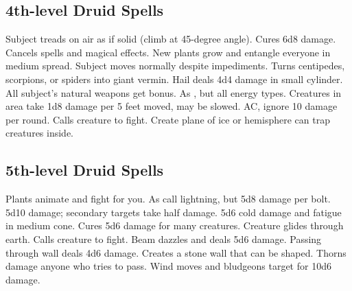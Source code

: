 \subsection{4th-level Druid Spells}
\begin{spelllist}
   Subject treads on air as if solid (climb at 45-degree angle).
   Cures 6d8 damage.
   Cancels spells and magical effects.
   New plants grow and entangle everyone in medium spread.
   Subject moves normally despite impediments.
   Turns centipedes, scorpions, or spiders into giant vermin.
   Hail deals 4d4 damage in small cylinder.
   All subject's natural weapons get  bonus.
   As , but all energy types.
   Creatures in area take 1d8 damage per 5 feet moved, may be slowed.
    AC, ignore 10 damage per round.
   Calls creature to fight.
   Create plane of ice or hemisphere can trap creatures inside.
\end{spelllist}

\subsection{5th-level Druid Spells}
\begin{spelllist}
   Plants animate and fight for you.
   As call lightning, but 5d8 damage per bolt.
   5d10 damage; secondary targets take half damage.
   5d6 cold damage and fatigue in medium cone.
   Cures 5d6 damage for many creatures.
   Creature glides through earth. 
   Calls creature to fight.
   Beam dazzles and deals 5d6 damage.
   Passing through wall deals 4d6 damage.
   Creates a stone wall that can be shaped.
   Thorns damage anyone who tries to pass.
   Wind moves and bludgeons target for 10d6 damage.
\end{spelllist}

